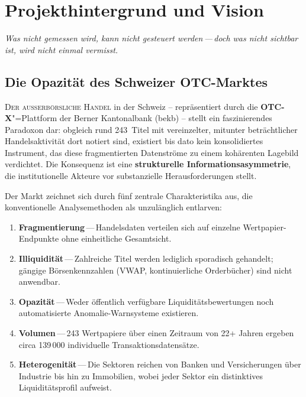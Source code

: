 \documentclass[11pt, a4paper, oneside, openany]{report}
\newcommand{\term}[1]{\textcolor{SwissRed}{\sffamily\textbf{#1}}}
\begin{document}
\chapter{Projekthintergrund und Vision}
\label{ch:hintergrund}

\epigraph{\itshape Was nicht gemessen wird, kann nicht gesteuert werden\,---\,doch was nicht sichtbar ist, wird nicht einmal vermisst.}{}

\section{Die Opazität des Schweizer OTC-Marktes}

\lettrine[lines=3, lraise=0.1, findent=3pt, nindent=0pt]{\textcolor{SwissRed}{D}}{er ausserbörsliche Handel} in der Schweiz -- repräsentiert durch die \term{OTC-X}"=Plattform der Berner Kantonalbank (\gls{bekb}) -- stellt ein faszinierendes Paradoxon dar: obgleich rund 243~Titel mit vereinzelter, mitunter beträchtlicher Handelsaktivität dort notiert sind, existiert bis dato kein konsolidiertes Instrument, das diese fragmentierten Datenströme zu einem kohärenten Lagebild verdichtet. Die Konsequenz ist eine \textbf{strukturelle Informationsasymmetrie}, die institutionelle Akteure vor substanzielle Herausforderungen stellt.

Der Markt zeichnet sich durch fünf zentrale Charakteristika aus, die konventionelle Analysemethoden als unzulänglich entlarven:

\begin{enumerate}[label=\textcolor{SwissRed}{\textbf{\arabic*.}}]
  \item \textbf{Fragmentierung}\,---\,Handelsdaten verteilen sich auf einzelne Wertpapier-Endpunkte ohne einheitliche Gesamtsicht.
  \item \textbf{Illiquidität}\,---\,Zahlreiche Titel werden lediglich sporadisch gehandelt; gängige Börsenkennzahlen (VWAP, kontinuierliche Orderbücher) sind nicht anwendbar.
  \item \textbf{Opazität}\,---\,Weder öffentlich verfügbare Liquiditätsbewertungen noch automatisierte Anomalie-Warnsysteme existieren.
  \item \textbf{Volumen}\,---\,243 Wertpapiere über einen Zeitraum von 22+ Jahren ergeben circa 139\,000 individuelle Transaktionsdatensätze.
  \item \textbf{Heterogenität}\,---\,Die Sektoren reichen von Banken und Versicherungen über Industrie bis hin zu Immobilien, wobei jeder Sektor ein distinktives Liquiditätsprofil aufweist.
\end{enumerate}
\end{document}
